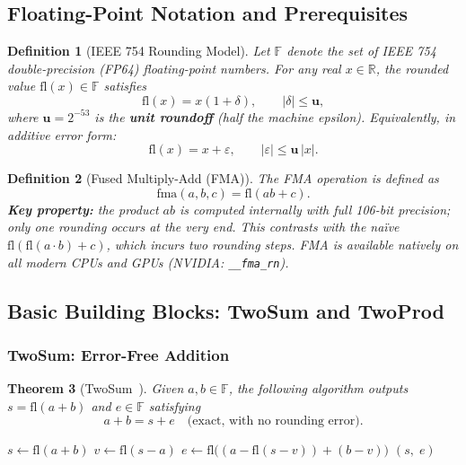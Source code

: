 \documentclass[12pt,a4paper]{article}
\newtheorem{theorem}{Theorem}[section]
\newtheorem{definition}[theorem]{Definition}
\newcommand{\fl}{\mathrm{fl}}
\newcommand{\uu}{\mathbf{u}}
\newcommand{\RR}{\mathbb{R}}
\newcommand{\FF}{\mathbb{F}}
\begin{document}
\subsection{Floating-Point Notation and Prerequisites}
\label{sec:notation}

\begin{definition}[IEEE 754 Rounding Model]
Let $\FF$ denote the set of IEEE 754 double-precision (FP64) floating-point numbers.
For any real $x \in \RR$, the rounded value $\fl(x) \in \FF$ satisfies
\begin{equation}
  \fl(x) = x(1 + \delta), \qquad |\delta| \leq \uu,
  \label{eq:rounding_model}
\end{equation}
where $\uu = 2^{-53}$ is the \textbf{unit roundoff} (half the machine epsilon).
Equivalently, in additive error form:
\begin{equation}
  \fl(x) = x + \varepsilon, \qquad |\varepsilon| \leq \uu\,|x|.
\end{equation}
\end{definition}

\begin{definition}[Fused Multiply-Add (FMA)]
The FMA operation is defined as
\begin{equation}
  \mathrm{fma}(a, b, c) = \fl(ab + c).
\end{equation}
\textbf{Key property:} the product $ab$ is computed internally with full 106-bit
precision; only one rounding occurs at the very end.
This contrasts with the na\"{i}ve $\fl(\fl(a \cdot b) + c)$, which incurs
\emph{two} rounding steps.
FMA is available natively on all modern CPUs and GPUs (NVIDIA: \texttt{\_\_fma\_rn}).
\end{definition}

\subsection{Basic Building Blocks: TwoSum and TwoProd}

\subsubsection{TwoSum: Error-Free Addition}

\begin{theorem}[TwoSum~\cite{Knuth1969,Moller1965}]
\label{thm:twosum}
Given $a, b \in \FF$, the following algorithm outputs $s = \fl(a + b)$ and
$e \in \FF$ satisfying
\begin{equation}
  a + b = s + e \quad \text{(exact, with no rounding error)}.
  \label{eq:twosum_exact}
\end{equation}

\begin{algorithm}[H]
\caption{$\mathrm{TwoSum}(a, b) \to (s,\, e)$}
\begin{algorithmic}[1]
\State $s \leftarrow \fl(a + b)$
\State $v \leftarrow \fl(s - a)$
\State $e \leftarrow \fl\bigl((a - \fl(s - v)) + (b - v)\bigr)$
\State \Return $(s,\; e)$
\end{algorithmic}
\end{algorithm}
\end{theorem}
\end{document}
